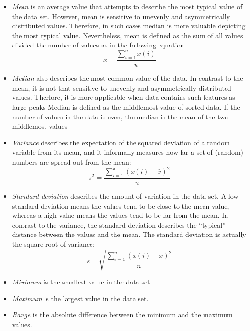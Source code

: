 \documentclass[english,12pt,a4paper,pdftex,elec,utf8]{aaltothesis}
\begin{document}
\begin{itemize}
\item \textit{Mean} is an average value that attempts to describe the most typical value of the data set. However, mean is sensitive to unevenly and asymmetrically distributed values. Therefore, in such cases median is more valuable depicting the most typical value. Nevertheless,  mean is defined as the sum of all values divided the number of values as in the following equation.
\begin{equation} \label{meanequation}
\bar{x} = \frac{\displaystyle \sum\limits^{n}_{i = 1} x(i)}{n}
\end{equation} 

\item \textit{Median} also describes the most common value of the data. In contrast to the mean, it is not that sensitive to unevenly and asymmetrically distributed values. Therfore, it is more applicable when data contains such features as large peaks Median is defined as the middlemost value of sorted data. If the number of values in the data is even, the median is the mean of the two middlemost values.

\item \textit{Variance} describes the expectation of the squared deviation of a random variable from its mean, and it informally measures how far a set of (random) numbers are spread out from the mean:
\begin{equation} \label{varianceequation}
s^2 = \frac{ \sum\limits_{i = 1}^{n}(x(i) - \bar{x})^2}{n}
\end{equation} 

\item \textit{Standard deviation} describes the amount of variation in the data set. A low standard deviation means the values tend to be close to the mean value, whereas a high value means the values tend to be far from the mean. In contrast to the variance, the standard deviation describes the ``typical''  distance between the values and the mean. The standard deviation is actually the square root of variance:
\begin{equation} \label{standarddeviationequation}
s = \sqrt{\frac{ \sum\limits_{i = 1}^{n}(x(i) - \bar{x})^2}{n}}
\end{equation}

\item \textit{Minimum} is the smallest value in the data set.

\item \textit{Maximum} is the largest value in the data set.

\item \textit{Range} is the absolute difference between the minimum and the maximum values.
\end{itemize}
\end{document}
